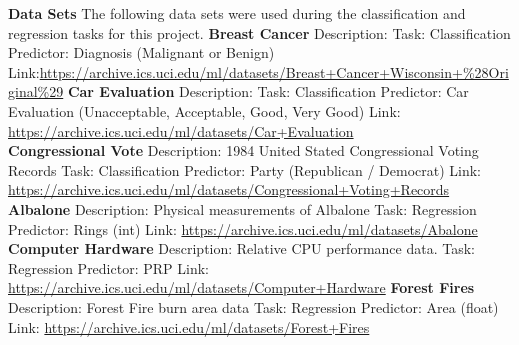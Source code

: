 \documentclass[twoside,11pt]{article}
\begin{document}
\newpage
{\noindent}{\bf Data Sets}\newline
The following data sets were used during the classification and regression tasks for this project.\newline
{\bf Breast Cancer}\newline
Description: \newline
Task: Classification\newline
Predictor: Diagnosis (Malignant or Benign)\newline
Link:\newline \url{https://archive.ics.uci.edu/ml/datasets/Breast+Cancer+Wisconsin+%28Original%29}\newline
{\noindent}\textbf{Car Evaluation}\newline
Description:\newline
Task: Classification\newline
Predictor: Car Evaluation (Unacceptable, Acceptable, Good, Very Good)\newline
Link: \newline
\url{https://archive.ics.uci.edu/ml/datasets/Car+Evaluation}\\
{\noindent}\textbf{Congressional Vote}\newline
Description: 1984 United Stated Congressional Voting Records\newline
Task: Classification \newline
Predictor: Party (Republican / Democrat) \newline
Link: \newline
\url{https://archive.ics.uci.edu/ml/datasets/Congressional+Voting+Records}\newline
{\noindent}\textbf{Albalone}\newline
Description: Physical measurements of Albalone\newline
Task: Regression\newline
Predictor: Rings (int)\newline
Link: \newline
\url{https://archive.ics.uci.edu/ml/datasets/Abalone}\newline
{\noindent}\textbf{Computer Hardware}\newline
Description: Relative CPU performance data.\newline
Task: Regression\newline
Predictor: PRP\newline
Link: \newline
\url{https://archive.ics.uci.edu/ml/datasets/Computer+Hardware}\newline
{\noindent}\textbf{Forest Fires}\newline
Description: Forest Fire burn area data\newline
Task: Regression\newline
Predictor: Area (float)\newline
Link: \newline
\url{https://archive.ics.uci.edu/ml/datasets/Forest+Fires}\newline
	
\end{document}
